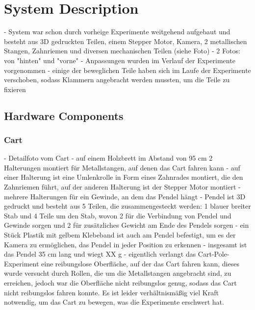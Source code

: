 \chapter{System Description}

- System war schon durch vorheige Experimente weitgehend aufgebaut und besteht aus 3D gedruckten Teilen, einem Stepper Motor, Kamera, 2 metallischen Stangen, Zahnriemen und diversen mechanischen Teilen (siehe Foto)
- 2 Fotos: von "hinten" und "vorne"
- Anpassungen wurden im Verlauf der Experimente vorgenommen
- einige der beweglichen Teile haben sich im Laufe der Experimente verschoben, sodass Klammern angebracht werden mussten, um die Teile zu fixieren

\section{Hardware Components}
\subsection{Cart}
- Detailfoto vom Cart
- auf einem Holzbrett im Abstand von 95 cm 2 Halterungen montiert für Metallstangen, auf denen das Cart fahren kann
- auf einer Halterung ist eine Umlenkrolle in Form eines Zahnrades montiert, die den Zahnriemen führt, auf der anderen Halterung ist der Stepper Motor montiert
- mehrere Halterungen für ein Gewinde, an dem das Pendel hängt
- Pendel ist 3D gedruckt und besteht aus 5 Teilen, die zusammengesteckt werden: 1 blauer breiter Stab und 4 Teile um den Stab, wovon 2 für die Verbindung von Pendel und Gewinde sorgen und 2 für zusätzliches Gewicht am Ende des Pendels sorgen
- ein Stück Plastik mit gelbem Klebeband ist auch am Pendel befestigt, um es der Kamera zu ermöglichen, das Pendel in jeder Position zu erkennen
- insgesamt ist das Pendel 35 cm lang und wiegt XX g %
- eigentlich verlangt das Cart-Pole-Experiment eine reibungslose Oberfläche, auf der das Cart fahren kann, dieses wurde versucht durch Rollen, die um die Metallstangen angebracht sind, zu erreichen, jedoch war die Oberfläche nicht reibungslos genug, sodass das Cart nicht reibungslos fahren konnte. Es ist leider verhältnismäßig viel Kraft notwendig, um das Cart zu bewegen, was die Experimente erschwert hat.

